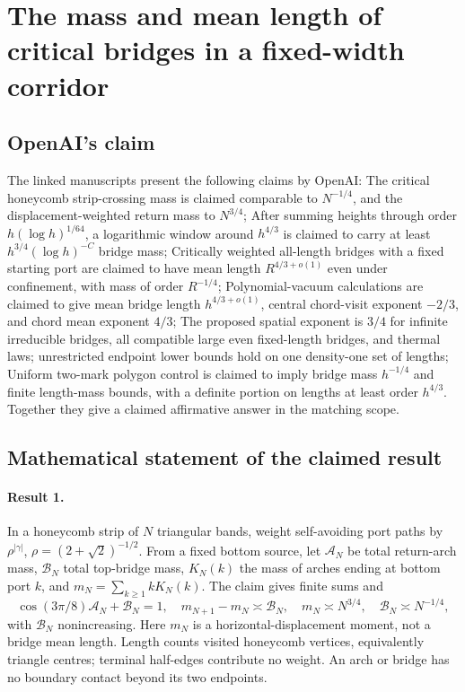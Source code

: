 \documentclass[11pt]{article}
\begin{document}
\section*{The mass and mean length of critical bridges in a fixed-width corridor}

\subsection{OpenAI's claim}
The linked manuscripts present the following claims by OpenAI: The critical honeycomb strip-crossing mass is claimed comparable to $N^{-1/4}$, and the displacement-weighted return mass to $N^{3/4}$; After summing heights through order $h(\log h)^{1/64}$, a logarithmic window around $h^{4/3}$ is claimed to carry at least $h^{3/4}(\log h)^{-C}$ bridge mass; Critically weighted all-length bridges with a fixed starting port are claimed to have mean length $R^{4/3+o(1)}$ even under confinement, with mass of order $R^{-1/4}$; Polynomial-vacuum calculations are claimed to give mean bridge length $h^{4/3+o(1)}$, central chord-visit exponent $-2/3$, and chord mean exponent $4/3$; The proposed spatial exponent is $3/4$ for infinite irreducible bridges, all compatible large even fixed-length bridges, and thermal laws; unrestricted endpoint lower bounds hold on one density-one set of lengths; Uniform two-mark polygon control is claimed to imply bridge mass $h^{-1/4}$ and finite length-mass bounds, with a definite portion on lengths at least order $h^{4/3}$. Together they give a claimed affirmative answer in the matching scope.

\subsection{Mathematical statement of the claimed result}
\paragraph{Result 1.} In a honeycomb strip of \(N\) triangular bands, weight self-avoiding port paths by \(\rho^{|\gamma|}\), \(\rho=(2+\sqrt2)^{-1/2}\). From a fixed bottom source, let \(\mathcal A_N\) be total return-arch mass, \(\mathcal B_N\) total top-bridge mass, \(K_N(k)\) the mass of arches ending at bottom port \(k\), and \(m_N=\sum_{k\ge1}kK_N(k)\). The claim gives finite sums and
\[
 \cos(3\pi/8)\mathcal A_N+\mathcal B_N=1,\quad
 m_{N+1}-m_N\asymp\mathcal B_N,\quad
 m_N\asymp N^{3/4},\quad\mathcal B_N\asymp N^{-1/4},
\]
with \(\mathcal B_N\) nonincreasing. Here \(m_N\) is a horizontal-displacement moment, not a bridge mean length. Length counts visited honeycomb vertices, equivalently triangle centres; terminal half-edges contribute no weight. An arch or bridge has no boundary contact beyond its two endpoints.
\end{document}
